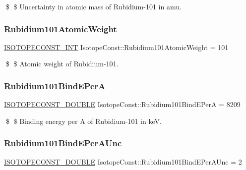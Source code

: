 \$ \$ Uncertainty in atomic mass of Rubidium-\/101 in amu. \mbox{\label{group___isotope_const-_rubidium-_rb101_gaf16afbadc82e4158e900f5630a1cf464}} 
\subsubsection{\texorpdfstring{Rubidium101\+Atomic\+Weight}{Rubidium101AtomicWeight}}
{\footnotesize\ttfamily \mbox{\hyperlink{group___isotope_const-_macros_ga5f18360b3e99483a35c32d789e62621c}{I\+S\+O\+T\+O\+P\+E\+C\+O\+N\+S\+T\+\_\+\+I\+NT}} Isotope\+Const\+::\+Rubidium101\+Atomic\+Weight = 101}

\$ \$ Atomic weight of Rubidium-\/101. \mbox{\label{group___isotope_const-_rubidium-_rb101_gaf998d4baa06e9d1f5020d1249c64ab99}} 
\subsubsection{\texorpdfstring{Rubidium101\+Bind\+E\+PerA}{Rubidium101BindEPerA}}
{\footnotesize\ttfamily \mbox{\hyperlink{group___isotope_const-_macros_ga8f45a7272ce02c0b4c65c44636ed719a}{I\+S\+O\+T\+O\+P\+E\+C\+O\+N\+S\+T\+\_\+\+D\+O\+U\+B\+LE}} Isotope\+Const\+::\+Rubidium101\+Bind\+E\+PerA = 8209}

\$ \$ Binding energy per A of Rubidium-\/101 in keV. \mbox{\label{group___isotope_const-_rubidium-_rb101_gae6c41d49f7aade25b790ae61071f25c2}} 
\subsubsection{\texorpdfstring{Rubidium101\+Bind\+E\+Per\+A\+Unc}{Rubidium101BindEPerAUnc}}
{\footnotesize\ttfamily \mbox{\hyperlink{group___isotope_const-_macros_ga8f45a7272ce02c0b4c65c44636ed719a}{I\+S\+O\+T\+O\+P\+E\+C\+O\+N\+S\+T\+\_\+\+D\+O\+U\+B\+LE}} Isotope\+Const\+::\+Rubidium101\+Bind\+E\+Per\+A\+Unc = 2}

